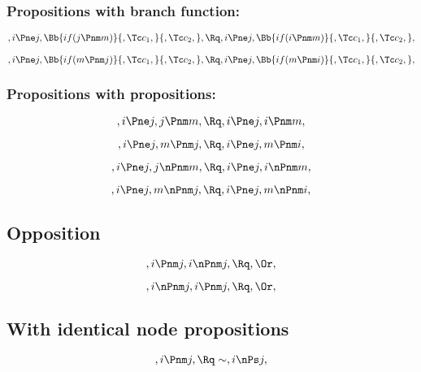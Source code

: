 \subsubsection{Propositions with branch function:}
\[,i \Pne j, \Bb{if(j \Pnm m)}{,\Tc c_1,}{,\Tc c_2,}, \Rq ,i \Pne j, \Bb{if(i \Pnm m)}{,\Tc c_1,}{,\Tc c_2,}, \]



\bigskip
\bigskip
\bigskip
\bigskip
\[,i \Pne j, \Bb{if(m \Pnm j)}{,\Tc c_1,}{,\Tc c_2,}, \Rq ,i \Pne j, \Bb{if(m \Pnm i)}{,\Tc c_1,}{,\Tc c_2,}, \]



\bigskip
\bigskip
\bigskip
\bigskip
\subsubsection{Propositions with propositions:}
\[,i \Pne j, j \Pnm m, \Rq , i \Pne j, i \Pnm m,\]

\[,i \Pne j, m \Pnm j, \Rq , i \Pne j, m \Pnm i,\]

\[,i \Pne j, j \nPnm m, \Rq , i \Pne j, i \nPnm m,\]

\[,i \Pne j, m \nPnm j, \Rq , i \Pne j, m \nPnm i,\]








\bigskip
\bigskip
\bigskip
\bigskip
\subsection{ Opposition}
\[,i \Pnm j, i \nPnm j, \Rq , \Or,\]


\[,i \nPnm j, i \Pnm j, \Rq , \Or,\]










\bigskip
\bigskip
\bigskip
\bigskip
\subsection{ With identical node propositions}

\[, i \Pnm j, \Rq \sim, i \nPs j, \]


